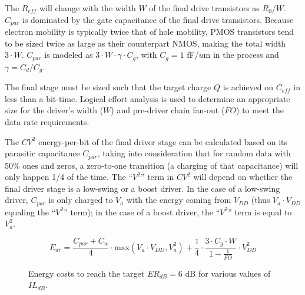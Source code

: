 The $R_{eff}$ will change with the width $W$ of the final drive transistors as $R_0/W$.  $C_{par}$ is dominated by the gate capacitance of the final drive transistors.  Because electron mobility is typically twice that of hole mobility, PMOS transistors tend to be sized twice as large as their counterpart NMOS, making the total width $3 \cdot W$.  $C_{par}$ is modeled as $3 \cdot W \cdot \gamma \cdot C_g$, with $C_g = 1$ fF/$u$m in the process and $\gamma = C_d/C_g$. 

The final stage must be sized such that the target charge $Q$ is achieved on $C_{eff}$ in less than a bit-time.  Logical effort analysis is used to determine an appropriate size for the driver's width ($W$) and pre-driver chain fan-out ($FO$) to meet the data rate requirements. 



The $CV^2$ energy-per-bit of the final driver stage can be calculated based on its parasitic capacitance $C_{par}$, taking into consideration that for random data with 50\% ones and zeros, a zero-to-one transition (a charging of that capacitance) will only happen 1/4 of the time.  The ``$V^2$'' term in $CV^2$ will depend on whether the final driver stage is a low-swing or a boost driver.  In the case of a low-swing driver, $C_{par}$ is only charged to $V_a$ with the energy coming from $V_{DD}$ (thus $V_a \cdot V_{DD}$ equaling the ``$V^2$'' term); in the case of a boost driver, the ``$V^2$'' term is equal to $V_a^2$.  

	\begin{equation}
E_{dr} = \frac{C_{par} + C_{w}}{4} \cdot \mbox{max} \left(V_a \cdot V_{DD}, V_a^2 \right) + \frac{1}{4} \cdot \frac{3 \cdot C_g \cdot W}{1 - \frac{1}{FO}} \cdot V_{DD}^2
	\label{eqn:delay}
	\end{equation}


	\begin{figure}[H]\begin{center}
    \vspace{-20pt}
		\caption{Energy costs to reach the target $ER_{dB}=6$ dB for various values of $IL_{dB}$.\label{fig:energy}}
    \vspace{-10pt}
	\end{center} \end{figure}
	

